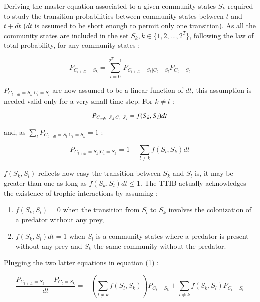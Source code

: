 Deriving the master equation associated to a given community states
\(S_k\) required to study the transition probabilities between community
states between \(t\) and \(t+dt\) (\(dt\) is assumed to be short enough
to permit only one transition). As all the community states are included
in the set \(S_k, k\in\{1,2,...,2^T\}\), following the law of total
probability, for any community states :

\begin{equation}
P_{C_{t+dt}=S_{k}}= \sum_{l=0}^{2^T-1} P_{C_{t+dt}=S_k|C_{t}=S_l}P_{C_{t}=S_l}
\end{equation}

\(P_{C_{t+dt}=S_k|C_{t}=S_l}\) are now assumed to be a linear function
of \(dt\), this assumption is needed valid only for a very small time
step. For \(k \neq l\) :

\begin{equation}
P_{C_{t+dt}=S_k|C_{t}=S_l} = f(S_k,S_l)dt \\
\end{equation}

and, as \(\sum_l P_{C_{t+dt}=S_l|C_{t}=S_k} = 1\) :

\begin{equation}
P_{C_{t+dt}=S_k|C_{t}=S_k} = 1-\sum_{l \neq k}f(S_l,S_k)dt
\end{equation}

\(f(S_k,S_l)\) reflects how easy the transition between \(S_k\) and
\(S_l\) is, it may be greater than one as long as
\(f(S_k,S_l)dt\leqslant1\). The TTIB actually acknowledges the existence
of trophic interactions by assuming :

\begin{enumerate}
\def\labelenumi{\arabic{enumi}.}
\tightlist
\item
  \(f(S_k,S_l)=0\) when the transition from \(S_l\) to \(S_k\) involves
  the colonization of a predator without any prey,
\item
  \(f(S_k,S_l)dt=1\) when \(S_l\) is a community states where a predator
  is present without any prey and \(S_k\) the same community without the
  predator.
\end{enumerate}

Plugging the two latter equations in equation (1) :

\begin{equation}
\frac{P_{C_{t+dt}=S_{k}}-P_{C_{t}=S_{k}}}{dt} = -\left(\sum_{l \neq k}f(S_l,S_k)\right)P_{C_{t}=S_{k}} + \sum_{l \neq k}f(S_k,S_l)P_{C_{t}=S_{l}}
\end{equation}

